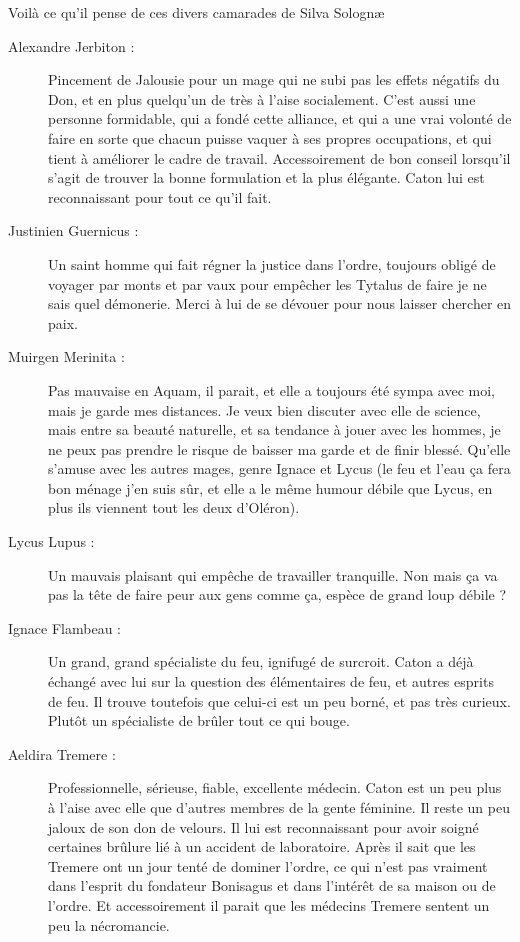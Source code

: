 Voilà ce qu'il pense de ces divers camarades de Silva Solognæ
\begin{description}
\item[Alexandre Jerbiton :] Pincement de Jalousie pour un mage qui ne subi pas les effets négatifs du Don, et en plus quelqu'un de très à l'aise socialement. C'est aussi une personne formidable, qui a fondé cette alliance, et qui a une vrai volonté de faire en sorte que chacun puisse vaquer à ses propres occupations, et qui tient à améliorer le cadre de travail. Accessoirement de bon conseil lorsqu'il s'agit de trouver la bonne formulation et la plus élégante. Caton lui est reconnaissant pour tout ce qu'il fait.
\item[Justinien Guernicus :] Un saint homme qui fait régner la justice dans l'ordre, toujours obligé de voyager par monts et par vaux pour empêcher les Tytalus de faire je ne sais quel démonerie. Merci à lui de se dévouer pour nous laisser chercher en paix.
\item[Muirgen Merinita :] Pas mauvaise en Aquam, il parait, et elle a toujours été sympa avec moi, mais je garde mes distances. Je veux bien discuter avec elle de science, mais entre sa beauté naturelle, et sa tendance à jouer avec les hommes, je ne peux pas prendre le risque de baisser ma garde et de finir blessé. Qu'elle s'amuse avec les autres mages, genre Ignace et Lycus (le feu et l'eau ça fera bon ménage j'en suis sûr, et elle a le même humour débile que Lycus, en plus ils viennent tout les deux d'Oléron).
\item[Lycus Lupus :] Un mauvais plaisant qui empêche de travailler tranquille. Non mais ça va pas la tête de faire peur aux gens comme ça, espèce de grand loup débile ?
\item[Ignace Flambeau :] Un grand, grand spécialiste du feu, ignifugé de surcroit. Caton a déjà échangé avec lui sur la question des élémentaires de feu, et autres esprits de feu. Il trouve toutefois que celui-ci est un peu borné, et pas très curieux. Plutôt un spécialiste de brûler tout ce qui bouge.
\item[Aeldira Tremere :] Professionnelle, sérieuse, fiable, excellente médecin. Caton est un peu plus à l'aise avec elle que d'autres membres de la gente féminine. Il reste un peu jaloux de son don de velours. Il lui est reconnaissant pour avoir soigné certaines brûlure lié à un accident de laboratoire. Après il sait que les Tremere ont un jour tenté de dominer l'ordre, ce qui n'est pas vraiment dans l'esprit du fondateur Bonisagus et dans l'intérêt de sa maison ou de l'ordre. Et accessoirement il parait que les médecins Tremere sentent un peu la nécromancie.
\end{description}

